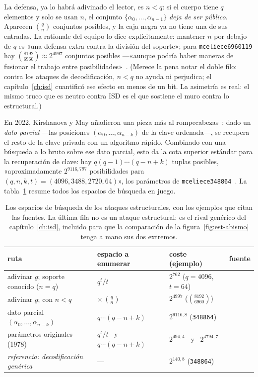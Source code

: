 \documentclass[11pt,a4paper,oneside]{report}
\begin{document}
La defensa, ya lo habrá adivinado el lector, es $n<q$: si el cuerpo
tiene $q$ elementos y solo se usan $n$, el conjunto
$\{\alpha_0,\dots,\alpha_{n-1}\}$ \emph{deja de ser público}.
Aparecen $\binom{q}{n}$ conjuntos posibles, y la caja negra ya no
tiene una de sus entradas. La rationale del equipo lo dice
explícitamente: mantener $n$ por debajo de $q$ es «una defensa extra
contra la división del soporte»; para \texttt{mceliece6960119} hay
$\binom{8192}{6960}\approx 2^{4997}$ conjuntos posibles ---«aunque
podría haber maneras de fusionar el trabajo entre
posibilidades»~\cite{cmrationale}. (Merece la pena notar el doble
filo: contra los ataques de decodificación, $n<q$ no ayuda ni
perjudica; el capítulo~\ref{ch:isd} cuantificó ese efecto en menos
de un bit. La asimetría es real: el mismo truco que es neutro contra
ISD es el que sostiene el muro contra lo estructural.)

En 2022, Kirshanova y May añadieron una pieza más al
rompecabezas~\cite{kirshanova2022}: dado un \emph{dato parcial} ---las
posiciones $(\alpha_0,\dots,\alpha_{n-k})$ de la clave ordenada---,
se recupera el resto de la clave privada con un algoritmo rápido.
Combinado con una búsqueda a lo bruto sobre ese dato parcial, esto
da la cota superior estándar para la recuperación de clave: hay
$q(q-1)\cdots(q-n+k)$ tuplas posibles, «aproximadamente
$2^{9116{,}797}$ posibilidades para
$(q,n,k,t)=(4096,3488,2720,64)$», los parámetros de
\texttt{mceliece348864}~\cite{cmsecurity}. La tabla~\ref{tab:est-espacios}
resume todos los espacios de búsqueda en juego.

\begin{table}[htbp]
\centering
\footnotesize
\setlength{\tabcolsep}{5pt}
\begin{tabular}{llll}
\toprule
ruta & espacio a enumerar & coste (ejemplo) & fuente\\
\midrule
adivinar $g$; soporte conocido ($n=q$) & $q^{t}/t$ &
  $2^{762}$ ($q=4096$, $t=64$) & \cite{cmsecurity}\\
adivinar $g$; con $n<q$ & $\times\,\binom{q}{n}$ &
  $2^{4997}$ ($\binom{8192}{6960}$) & \cite{cmrationale}\\
dato parcial $(\alpha_0,\dots,\alpha_{n-k})$ & $q\cdots(q-n+k)$ &
  $2^{9116{,}8}$ (\texttt{348864}) & \cite{cmsecurity,kirshanova2022}\\
parámetros originales (1978) & $q^{t}/t$ \ y \ $q\cdots(q-n+k)$ &
  $2^{494{,}4}$ \ y \ $2^{4794{,}7}$ & \cite{cmrationale}\\
\midrule
\emph{referencia: decodificación genérica} & --- &
  $2^{140{,}8}$ (\texttt{348864}) & \cite{cmsecurity}\\
\bottomrule
\end{tabular}
\caption{Los espacios de búsqueda de los ataques estructurales, con
los ejemplos que citan las fuentes. La última fila no es un ataque
estructural: es el rival genérico del capítulo~\ref{ch:isd}, incluido
para que la comparación de la figura~\ref{fig:est-abismo} tenga a
mano sus dos extremos.}
\label{tab:est-espacios}
\end{table}
\end{document}
